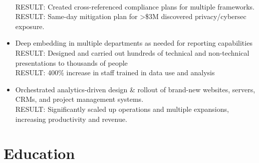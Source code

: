 \documentclass[]{deedy-resume-openfont}
\begin{document}
\begin{itemize}
        \\ RESULT: Created cross-referenced compliance plans for multiple frameworks.
        \\ RESULT: Same-day mitigation plan for >\$3M discovered privacy/cybersec exposure.
        \item Deep embedding in multiple departments as needed for reporting capabilities
        \\ RESULT: Designed and carried out hundreds of technical and non-technical presentations to thousands of people
        \\ RESULT: 400\% increase in staff trained in data use and analysis
        \item Orchestrated analytics-driven design \& rollout of brand-new websites, servers, CRMs, and project management systems.
        \\ RESULT: Significantly scaled up operations and multiple expansions, increasing productivity and revenue.
    \end{itemize}

\iffalse

\section{Education}
    \sectionsep
    \sectionsep
\end{document}
